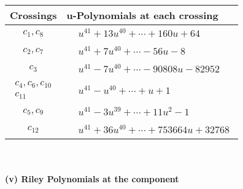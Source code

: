 \documentclass[1p]{elsarticle_modified}
\theoremstyle{definition}
\begin{document}
\begin{tabular}{m{50pt}|m{274pt}}
Crossings & \hspace{64pt}u-Polynomials at each crossing \\
\hline $$\begin{aligned}c_{1},c_{8}\end{aligned}$$&$\begin{aligned}
&u^{41}+13 u^{40}+\cdots+160 u+64
\end{aligned}$\\
\hline $$\begin{aligned}c_{2},c_{7}\end{aligned}$$&$\begin{aligned}
&u^{41}+7 u^{40}+\cdots-56 u-8
\end{aligned}$\\
\hline $$\begin{aligned}c_{3}\end{aligned}$$&$\begin{aligned}
&u^{41}-7 u^{40}+\cdots-90808 u-82952
\end{aligned}$\\
\hline $$\begin{aligned}c_{4},c_{6},c_{10}\\c_{11}\end{aligned}$$&$\begin{aligned}
&u^{41}- u^{40}+\cdots+u+1
\end{aligned}$\\
\hline $$\begin{aligned}c_{5},c_{9}\end{aligned}$$&$\begin{aligned}
&u^{41}-3 u^{39}+\cdots+11 u^2-1
\end{aligned}$\\
\hline $$\begin{aligned}c_{12}\end{aligned}$$&$\begin{aligned}
&u^{41}+36 u^{40}+\cdots+753664 u+32768
\end{aligned}$\\
\hline
\end{tabular}\\~\\
\newpage\renewcommand{\arraystretch}{1}
\flushleft \textbf{(v) Riley Polynomials at the component}\newline \\
\end{document}
